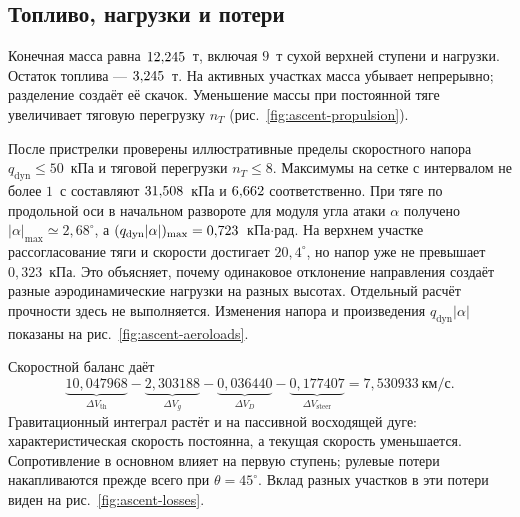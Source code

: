 \FloatBarrier
\subsection{Топливо, нагрузки и потери}

Конечная масса равна $12{,}245$~т, включая $9$~т сухой
верхней ступени и нагрузки. Остаток топлива --- $3{,}245$~т.
На активных участках масса убывает непрерывно; разделение создаёт
её скачок. Уменьшение массы при постоянной тяге увеличивает
тяговую перегрузку $n_T$ (рис.~\ref{fig:ascent-propulsion}).


После пристрелки проверены иллюстративные пределы скоростного напора
$q_{\mathrm{dyn}}\le50$~кПа и тяговой перегрузки $n_T\le8$.
Максимумы на сетке с интервалом не более $1$~с составляют
$31{,}508$~кПа и $6{,}662$ соответственно.
При тяге по продольной оси в начальном развороте для модуля
угла атаки $\alpha$ получено
$|\alpha|_{\max}\simeq2{,}68^\circ$,
а $(q_{\mathrm{dyn}}|\alpha|)_{\max}=0{,}723$~кПа$\cdot$рад.
На верхнем участке рассогласование тяги и скорости достигает
$20{,}4^\circ$, но напор уже не превышает $0{,}323$~кПа.
Это объясняет, почему одинаковое отклонение направления
создаёт разные аэродинамические нагрузки на разных высотах.
Отдельный расчёт прочности здесь не выполняется.
Изменения напора и произведения $q_{\mathrm{dyn}}|\alpha|$
показаны на рис.~\ref{fig:ascent-aeroloads}.


Скоростной баланс даёт
\begin{equation}
 \underbrace{10{,}047968}_{\Delta V_{\mathrm{th}}}
 -\underbrace{2{,}303188}_{\Delta V_g}
 -\underbrace{0{,}036440}_{\Delta V_D}
 -\underbrace{0{,}177407}_{\Delta V_{\mathrm{steer}}}
 =7{,}530933\ \text{км}/\text{с}.
 \label{eq:numerical-speed-budget}
\end{equation}
Гравитационный интеграл растёт и на пассивной восходящей дуге:
характеристическая скорость постоянна, а текущая скорость уменьшается.
Сопротивление в основном влияет на первую ступень;
рулевые потери накапливаются прежде всего при $\theta=45^\circ$.
Вклад разных участков в эти потери виден
на рис.~\ref{fig:ascent-losses}.

